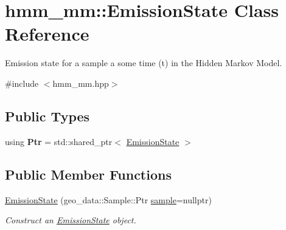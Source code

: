 \hypertarget{classhmm__mm_1_1EmissionState}{}\section{hmm\+\_\+mm\+:\+:Emission\+State Class Reference}
\label{classhmm__mm_1_1EmissionState}


Emission state for a sample a some time (t) in the Hidden Markov Model.  




{\ttfamily \#include $<$hmm\+\_\+mm.\+hpp$>$}

\subsection*{Public Types}
\begin{DoxyCompactItemize}
\item 
using {\bfseries Ptr} = std\+::shared\+\_\+ptr$<$ \hyperlink{classhmm__mm_1_1EmissionState}{Emission\+State} $>$\hypertarget{classhmm__mm_1_1EmissionState_a3a77bd80597c503af5bdfaf5fb7e4f52}{}\label{classhmm__mm_1_1EmissionState_a3a77bd80597c503af5bdfaf5fb7e4f52}

\end{DoxyCompactItemize}
\subsection*{Public Member Functions}
\begin{DoxyCompactItemize}
\item 
\hyperlink{classhmm__mm_1_1EmissionState_a940c45981493c0b8673e48b5016e7d62}{Emission\+State} (geo\+\_\+data\+::\+Sample\+::\+Ptr \hyperlink{classhmm__mm_1_1EmissionState_a7a7746e0e8681e12106cc3754f68df63}{sample}=nullptr)
\begin{DoxyCompactList}\small\item\em Construct an \hyperlink{classhmm__mm_1_1EmissionState}{Emission\+State} object. \end{DoxyCompactList}\end{DoxyCompactItemize}
